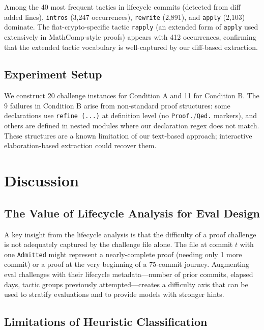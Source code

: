 \documentclass[11pt]{article}
\begin{document}
Among the 40 most frequent tactics in lifecycle commits (detected from diff added lines), \texttt{intros} (3,247 occurrences), \texttt{rewrite} (2,891), and \texttt{apply} (2,103) dominate. The fiat-crypto-specific tactic \texttt{rapply} (an extended form of \texttt{apply} used extensively in MathComp-style proofs) appears with 412 occurrences, confirming that the extended tactic vocabulary is well-captured by our diff-based extraction.

\subsection{Experiment Setup}

We construct 20 challenge instances for Condition A and 11 for Condition B. The 9 failures in Condition B arise from non-standard proof structures: some declarations use \texttt{refine (...)} at definition level (no \texttt{Proof.}/\texttt{Qed.} markers), and others are defined in nested modules where our declaration regex does not match. These structures are a known limitation of our text-based approach; interactive elaboration-based extraction could recover them.

\section{Discussion}

\subsection{The Value of Lifecycle Analysis for Eval Design}

A key insight from the lifecycle analysis is that the difficulty of a proof challenge is not adequately captured by the challenge file alone. The file at commit $t$ with one \texttt{Admitted} might represent a nearly-complete proof (needing only 1 more commit) or a proof at the very beginning of a 75-commit journey. Augmenting eval challenges with their lifecycle metadata---number of prior commits, elapsed days, tactic groups previously attempted---creates a difficulty axis that can be used to stratify evaluations and to provide models with stronger hints.

\subsection{Limitations of Heuristic Classification}
\end{document}
